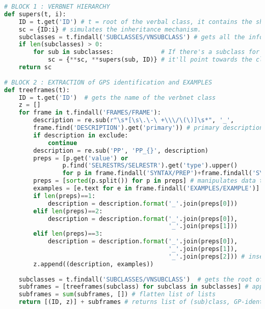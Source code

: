 \begin{lstlisting}[language=Python, caption = Importation de l'architecture des classes verbales, label=fig:archivn]
# BLOCK 1 : VERBNET HIERARCHY
def supers(t, i):
    ID = t.get('ID') # t = root of the verbal class, it contains the shared syntactic information.
    sc = {ID:i} # simulates the inheritance mechanism.
    subclasses = t.findall('SUBCLASSES/VNSUBCLASS') # gets all the information on the subclasses.
    if len(subclasses) > 0:
        for sub in subclasses:             # If there's a subclass for a given VNCLASS, 
            sc = {**sc, **supers(sub, ID)} # it'll point towards the class it's being dominated by.
    return sc
		
# BLOCK 2 : EXTRACTION of GPS identification and EXAMPLES
def treeframes(t):
    ID = t.get('ID')  # gets the name of the verbnet class
    z = []            
    for frame in t.findall('FRAMES/FRAME'):
        description = re.sub(r"\s*[\s\.\-\ +\\\/\(\)]\s*", '_',  
        frame.find('DESCRIPTION').get('primary')) # primary description = identification of a GP
        if description in exclude:
            continue
        description = re.sub('PP', 'PP_{}', description) 
        preps = [p.get('value') or 
                p.find('SELRESTRS/SELRESTR').get('type').upper()                  
                for p in frame.findall('SYNTAX/PREP')+frame.findall('SYNTAX/LEX')] 
        preps = [sorted(p.split()) for p in preps] # manipulates data to insert the prep. in desc.                                
        examples = [e.text for e in frame.findall('EXAMPLES/EXAMPLE')] # get ex. for each desc.
        if len(preps)==1:
            description = description.format('_'.join(preps[0]))
        elif len(preps)==2:
            description = description.format('_'.join(preps[0]),
                                             '_'.join(preps[1]))
        elif len(preps)==3:
            description = description.format('_'.join(preps[0]), 
                                             '_'.join(preps[1]), 
                                             '_'.join(preps[2])) # inserting preps in descriptions
        z.append((description, examples))
        
    subclasses = t.findall('SUBCLASSES/VNSUBCLASS')  # gets the root of each subclasses
    subframes = [treeframes(subclass) for subclass in subclasses] # applies function to subclasses
    subframes = sum(subframes, []) # flatten list of lists
    return [(ID, z)] + subframes # returns list of (sub)class, GP-identification and example
		

\end{lstlisting}

